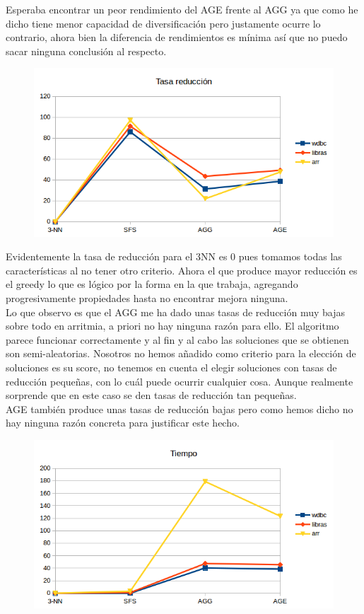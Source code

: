 \documentclass[10pt,a4paper]{article}
\begin{document}
Esperaba encontrar un peor rendimiento del AGE frente al AGG ya que como he dicho tiene menor capacidad de diversificación pero justamente ocurre lo contrario, ahora bien la diferencia de rendimientos es mínima así que no puedo sacar ninguna conclusión al respecto.\\


\begin{figure}[H]
\centering
\includegraphics[width=130mm]{reduccion_ag.png}
\end{figure}

Evidentemente la tasa de reducción para el 3NN es 0 pues tomamos todas las características al no tener otro criterio. Ahora el que produce mayor reducción es el greedy lo que es lógico por la forma en la que trabaja, agregando progresivamente propiedades hasta no encontrar mejora ninguna.\\

Lo que observo es que el AGG me ha dado unas tasas de reducción muy bajas sobre todo en arritmia, a priori no hay ninguna razón para ello. El algoritmo parece funcionar correctamente y al fin y al cabo las soluciones que se obtienen son semi-aleatorias. Nosotros no hemos añadido como criterio para la elección de soluciones es su score, no tenemos en cuenta el elegir soluciones con tasas de reducción pequeñas, con lo cuál puede ocurrir cualquier cosa. Aunque realmente sorprende que en este caso se den tasas de reducción tan pequeñas.\\

AGE también produce unas tasas de reducción bajas pero como hemos dicho no hay ninguna razón concreta para justificar este hecho.\\


\begin{figure}[H]
\centering
\includegraphics[width=130mm]{tiempo_ag.png}
\end{figure}
\end{document}
